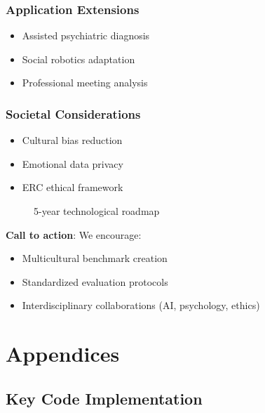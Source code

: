 \documentclass[a4paper,11pt]{article}
\begin{document}
\subsubsection{Application Extensions}
\begin{itemize}
    \item Assisted psychiatric diagnosis \cite{cummins2021multimodal}
    \item Social robotics adaptation \cite{breazeal2020social}
    \item Professional meeting analysis \cite{jung2023meeting}
\end{itemize}

\subsubsection{Societal Considerations}
\begin{itemize}
    \item Cultural bias reduction \cite{arora2022cultural}
    \item Emotional data privacy \cite{li2023privacy}
    \item ERC ethical framework \cite{mehrabi2021survey}
\end{itemize}

\begin{figure}[h]
\centering
\caption{5-year technological roadmap}
\label{fig:roadmap}
\end{figure}

\textbf{Call to action}: We encourage:
\begin{itemize}
    \item Multicultural benchmark creation
    \item Standardized evaluation protocols
    \item Interdisciplinary collaborations (AI, psychology, ethics)
\end{itemize}




\appendix
\section{Appendices}
\subsection{Key Code Implementation}
\end{document}

